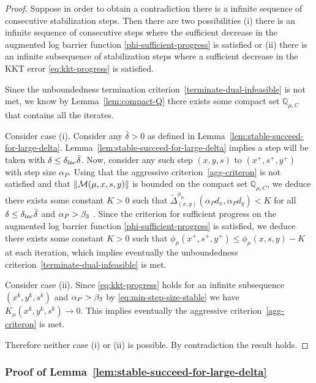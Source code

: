 \documentclass{article}
\begin{document}
\begin{proof}
Suppose in order to obtain a contradiction there is a infinite sequence of consecutive stabilization steps. Then there are two possibilities (i) there is an infinite sequence of consecutive steps where the sufficient decrease in the augmented log barrier function \eqref{phi-sufficient-progress} is satisfied or (ii) there is an infinite subsequence of stabilization steps where a sufficient decrease in the KKT error \eqref{eq:kkt-progress} is satisfied.

Since the unboundedness termination criterion~\eqref{terminate-dual-infeasible} is not met, we know by Lemma~\ref{lem:compact-Q} there exists some compact set $\mathbb{Q}_{\mu,C}$ that contains all the iterates.

Consider case (i). Consider any $\bar{\delta} > 0$ as defined in Lemma~\ref{lem:stable-succeed-for-large-delta}. Lemma~\ref{lem:stable-succeed-for-large-delta} implies a step will be taken with $\delta \le \delta_{\text{inc}} \bar{\delta}$. Now, consider any such step $(x,y,s)$ to $(x^{+}, s^{+}, y^{+})$ with step size $\alpha_{P}$. Using that the aggressive criterion~\eqref{agg-criteron} is not satisfied and that $\| \mathcal{M}(\mu, x, s, y) \|$ is bounded on the compact set $\mathbb{Q}_{\mu,C}$, we deduce there exists some constant $K > 0$ such that $\tilde{\Delta}^{\phi_{\mu}}_{(x,y)}(\alpha_{P} d_{x}, \alpha_{P} d_{y}) < K$ for all $\delta \le \delta_{\text{inc}} \bar{\delta}$ and $\alpha_{P} > \beta_{3}$ . Since the criterion for sufficient progress on the augmented log barrier function \eqref{phi-sufficient-progress} is satisfied, we deduce there exists some constant $K > 0$ such that $\phi_{\mu}(x^{+}, s^{+}, y^{+}) \le \phi_{\mu}(x, s, y) - K$ at each iteration, which implies eventually the unboundedness criterion~\eqref{terminate-dual-infeasible} is met. 

Consider case (ii). Since \eqref{eq:kkt-progress} holds for an infinite subsequence $(x^{k}, y^{k}, s^{k})$ and $\alpha_{P} > \beta_{3}$ by \eqref{eq:min-step-size-stable} we have $K_{\mu}(x^{k}, y^{k}, s^{k}) \rightarrow 0$. This implies eventually the aggressive criterion~\eqref{agg-criteron} is met.

Therefore neither case (i) or (ii) is possible. By contradiction the result holds.
\end{proof}


\subsubsection{Proof of Lemma~\ref{lem:stable-succeed-for-large-delta}}\label{sec:lem:stable-succeed-for-large-delta}
\end{document}
